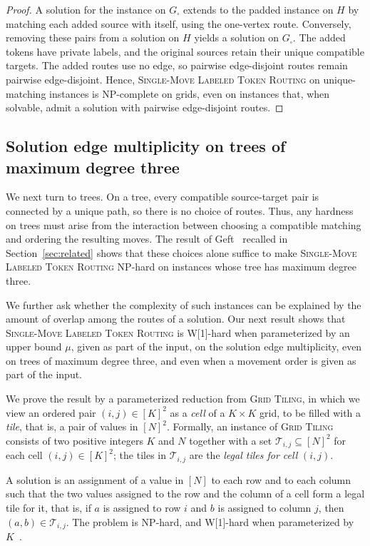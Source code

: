 \documentclass[a4paper,USenglish,thm-restate]{lipics-v2021}
\theoremstyle{problemstyle}
\begin{document}
\begin{proof}
A solution for the instance on $G_\square$ extends to the padded instance
on $H$ by matching each added source with itself, using the one-vertex
route. Conversely, removing these pairs from a solution on $H$ yields a
solution on $G_\square$. The added tokens have private labels, and the
original sources retain their unique compatible targets. The added routes
use no edge, so pairwise edge-disjoint routes remain pairwise edge-disjoint.
Hence, \textsc{Single-Move Labeled Token Routing} on unique-matching
instances is \textsf{NP}-complete on grids, even on instances that, when
solvable, admit a solution with pairwise edge-disjoint routes.
\end{proof}


\subsection{Solution edge multiplicity on trees of maximum degree three}
\label{sec:tree-hardness}
We next turn to trees. On a tree, every compatible source-target pair is
connected by a unique path, so there is no choice of routes. Thus, any
hardness on trees must arise from the interaction between choosing a
compatible matching and ordering the resulting moves. The result of
Geft~\cite{Geft2026Trees} recalled in Section~\ref{sec:related} shows that
these choices alone suffice to make \textsc{Single-Move Labeled Token
Routing} \textsf{NP}-hard on instances whose tree has maximum degree three.

We further ask whether the complexity of such instances can be explained by
the amount of overlap among the routes of a solution. Our next result shows
that \textsc{Single-Move Labeled Token Routing}
is \textsf{W}[1]-hard when parameterized by an upper bound $\mu$, given as
part of the input, on the solution edge multiplicity, even
on trees of maximum degree three, and even when a movement order is given as
part of the input.

We prove the result by a parameterized reduction from \textsc{Grid Tiling}, in which we view an ordered pair $(i,j)\in[K]^2$ as a \emph{cell} of a $K\times K$ grid, to be filled with a \emph{tile}, that is, a pair of values in $[N]^2$. Formally, an instance of \textsc{Grid Tiling} consists of two positive integers $K$ and $N$ together with a set $\mathcal{T}_{i,j}\subseteq[N]^2$ for each cell $(i,j)\in[K]^2$; the tiles in $\mathcal{T}_{i,j}$ are the \emph{legal tiles for cell} $(i,j)$.

A solution is an assignment of a value in $[N]$ to each row and to each column such that the two values assigned to the row and the column of a cell form a legal tile for it, that is, if $a$ is assigned to row $i$ and $b$ is assigned to column $j$, then $(a,b)\in\mathcal{T}_{i,j}$. The problem is \textsf{NP}-hard, and \textsf{W}[1]-hard when parameterized by $K$~\cite{Marx2007GT,cygan2015parameterized}.
\end{document}
